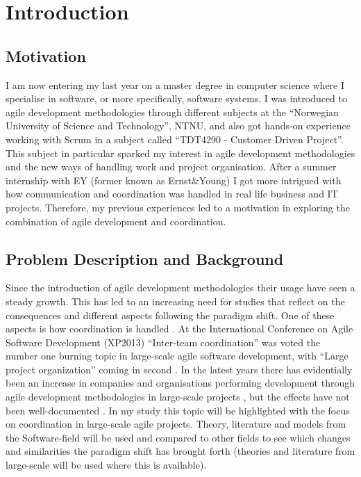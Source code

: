 \chapter{Introduction}


\minitoc

\newpage

\section{Motivation}

I am now entering my last year on a master degree in computer science where I specialise in software, or more specifically, software systems. I was introduced to agile development methodologies through different subjects at the ``Norwegian University of Science and Technology'', NTNU, and also got hands-on experience working with Scrum in a subject called ``TDT4290 - Customer Driven Project''. This subject in particular sparked my interest in agile development methodologies and the new ways of handling work and project organisation. After a summer internship with EY (former known as Ernst\&Young) I got more intrigued with how communication and coordination was handled in real life business and IT projects. Therefore, my previous experiences led to a motivation in exploring the combination of agile development and coordination.

\section{Problem Description and Background}
\label{pdab}


Since the introduction of agile development methodologies their usage have seen a steady growth. This has led to an increasing need for studies that reflect on the consequences and different aspects following the paradigm shift. One of these aspects is how coordination is handled \cite{Agerfalk2006, Leffingwell2007, Cockburn2002, Batra2010}. At the International Conference on Agile Software Development (XP2013) ``Inter-team coordination'' was voted the number one burning topic in large-scale agile software development, with ``Large project organization'' coming in second \cite{Dingsoyr2013b}.  In the latest years there has evidentially been an increase in companies and organisations performing development through agile development methodologies in large-scale projects \cite{Paasivaara2012, Com2013, Vlietland2015, Lindvall2004, Dingsoyr2013b, Lee2008, Paasivaara2009}, but the effects have not been well-documented \cite{Pikkarainen2008, Paasivaara2012, Freudenberg2010, Haaster2014, Dingsoyr2013a, Reifer2003}. In my study this topic will be highlighted with the focus on coordination in large-scale agile projects. Theory, literature and models from the Software-field will be used and compared to other fields to see which changes and similarities the paradigm shift has brought forth (theories and literature from large-scale will be used where this is available).

